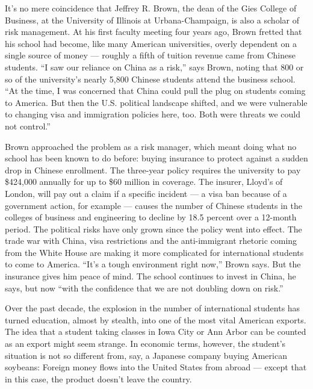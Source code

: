 It's no mere coincidence that Jeffrey R. Brown, the dean of the Gies
College of Business, at the University of Illinois at Urbana-Champaign,
is also a scholar of risk management. At his first faculty meeting four
years ago, Brown fretted that his school had become, like many American
universities, overly dependent on a single source of money --- roughly a
fifth of tuition revenue came from Chinese students. ``I saw our
reliance on China as a risk,'' says Brown, noting that 800 or so of the
university's nearly 5,800 Chinese students attend the business school.
``At the time, I was concerned that China could pull the plug on
students coming to America. But then the U.S. political landscape
shifted, and we were vulnerable to changing visa and immigration
policies here, too. Both were threats we could not control.''

Brown approached the problem as a risk manager, which meant doing what
no school has been known to do before: buying insurance to protect
against a sudden drop in Chinese enrollment. The three-year policy
requires the university to pay \$424,000 annually for up to \$60 million
in coverage. The insurer, Lloyd's of London, will pay out a claim if a
specific incident --- a visa ban because of a government action, for
example --- causes the number of Chinese students in the colleges of
business and engineering to decline by 18.5 percent over a 12-month
period. The political risks have only grown since the policy went into
effect. The trade war with China, visa restrictions and the
anti-immigrant rhetoric coming from the White House are making it more
complicated for international students to come to America. ``It's a
tough environment right now,'' Brown says. But the insurance gives him
peace of mind. The school continues to invest in China, he says, but now
``with the confidence that we are not doubling down on risk.''

Over the past decade, the explosion in the number of international
students has turned education, almost by stealth, into one of the most
vital American exports. The idea that a student taking classes in Iowa
City or Ann Arbor can be counted as an export might seem strange. In
economic terms, however, the student's situation is not so different
from, say, a Japanese company buying American soybeans: Foreign money
flows into the United States from abroad --- except that in this case,
the product doesn't leave the country.

